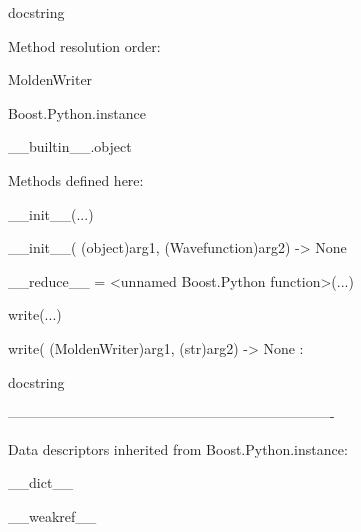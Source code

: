 \documentclass[letterpaper,10pt,english]{sphinxmanual}
\begin{document}
\begin{description}
\begin{description}
\item[{class MoldenWriter(Boost.Python.instance)}] \leavevmode
\begin{DUlineblock}{0em}
\item[] docstring
\item[] 
\item[] Method resolution order:
\item[]
\begin{DUlineblock}{\DUlineblockindent}
\item[] MoldenWriter
\item[] Boost.Python.instance
\item[] \_\_builtin\_\_.object
\item[] 
\end{DUlineblock}
\item[] Methods defined here:
\item[] 
\item[] \_\_init\_\_(...)
\item[]
\begin{DUlineblock}{\DUlineblockindent}
\item[] \_\_init\_\_( (object)arg1, (Wavefunction)arg2) -\textgreater{} None
\item[] 
\end{DUlineblock}
\item[] \_\_reduce\_\_ = \textless{}unnamed Boost.Python function\textgreater{}(...)
\item[] 
\item[] write(...)
\item[]
\begin{DUlineblock}{\DUlineblockindent}
\item[] write( (MoldenWriter)arg1, (str)arg2) -\textgreater{} None :
\item[]
\begin{DUlineblock}{\DUlineblockindent}
\item[] docstring
\item[] 
\end{DUlineblock}
\end{DUlineblock}
\item[] ----------------------------------------------------------------------
\item[] Data descriptors inherited from Boost.Python.instance:
\item[] 
\item[] \_\_dict\_\_
\item[] 
\item[] \_\_weakref\_\_
\item[] 

\end{DUlineblock}
\end{description}
\end{description}
\end{document}
